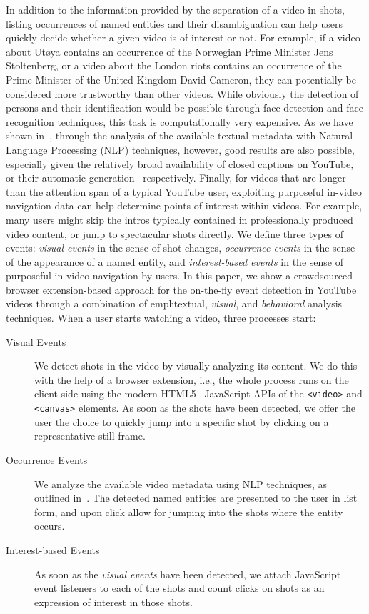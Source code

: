 \documentclass[runningheads,a4paper]{llncs}
\begin{document}
In addition to the information provided by the separation of a video in shots, listing occurrences of named entities and their disambiguation can help users quickly decide whether a given video is of interest or not. For example, if a video about Ut\o ya contains an occurrence of the Norwegian Prime Minister Jens Stoltenberg, or a video about the London riots contains an occurrence of the Prime Minister of the United Kingdom David Cameron, they can potentially be considered more trustworthy than other videos. While obviously the detection of persons and their identification would be possible through face detection and face recognition techniques, this task is computationally very expensive. As we have shown in~\cite{semwebvid}, through the analysis of the available textual metadata with Natural Language Processing (NLP) techniques, however, good results are also possible, especially given the relatively broad availability of closed captions on YouTube, or their automatic generation~\cite{youtubecaptions} respectively. Finally, for videos that are longer than the attention span of a typical YouTube user, exploiting purposeful in-video navigation data can help determine points of interest within videos. For example, many users might skip the intros typically contained in professionally produced video content, or jump to spectacular shots directly. We define three types of events: \emph{visual events} in the sense of shot changes, \emph{occurrence events} in the sense of the appearance of a named entity, and \emph{interest-based events} in the sense of purposeful in-video navigation by users. In this paper, we show a crowdsourced browser extension-based  approach for the on-the-fly event detection in YouTube videos through a combination of emph{textual}, \emph{visual}, and \emph{behavioral} analysis techniques. When a user starts watching a video, three processes start:

\begin{description}
  \item[Visual Events] We detect shots in the video by visually analyzing its content. We do this with the help of a browser extension, i.e., the whole process runs on the client-side using the modern HTML5~\cite{w3c_html5} JavaScript APIs of the \texttt{<video>} and \texttt{<canvas>} elements. As soon as the shots have been detected, we offer the user the choice to quickly jump into a specific shot by clicking on a representative still frame.
  \item[Occurrence Events] We analyze the available video metadata using NLP techniques, as outlined in~\cite{semwebvid}. The detected named entities are presented to the user in list form, and upon click allow for jumping into the  shots where the entity occurs.
  \item[Interest-based Events] As soon as the \emph{visual events} have been detected, we attach JavaScript event listeners to each of the shots and count clicks on shots as an expression of interest in those shots.
\end{description} 
 
\end{document}
